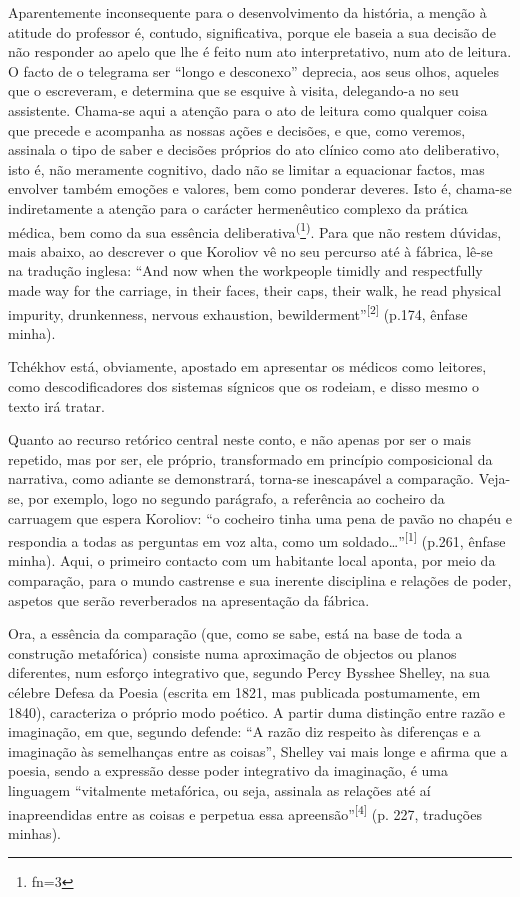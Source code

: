 \documentclass{article}
\makeatletter
\newcommand{\fn}{\afterassignment\fn@aux\count0=}
\newcommand{\fn@aux}{\csname fn\the\count0\endcsname}
\makeatother
\begin{document}
Aparentemente inconsequente para o desenvolvimento da história, a menção à
atitude do professor é, contudo, significativa, porque ele baseia a sua decisão
de não responder ao apelo que lhe é feito num ato interpretativo, num ato de
leitura. O facto de o telegrama ser “longo e desconexo” deprecia, aos seus
olhos, aqueles que o escreveram, e determina que se esquive à visita,
delegando-a no seu assistente. Chama-se aqui a atenção para o ato de leitura
como qualquer coisa que precede e acompanha as nossas ações e decisões, e que,
como veremos, assinala o tipo de saber e decisões próprios do ato clínico como
ato deliberativo, isto é, não meramente cognitivo, dado não se limitar a
equacionar factos, mas envolver também emoções e valores, bem como ponderar
deveres. Isto é, chama-se indiretamente a atenção para o carácter hermenêutico
complexo da prática médica, bem como da sua essência
deliberativa\textsuperscript{(}\footnote{\fn3}\textsuperscript{)}. Para que não restem dúvidas, mais abaixo, ao descrever o que Koroliov vê no
seu percurso até à fábrica, lê-se na tradução inglesa: “And now when the
workpeople timidly and respectfully made way for the carriage, in their faces,
their caps, their walk, he read physical impurity, drunkenness, nervous
exhaustion, bewilderment”\textsuperscript{[}\textsuperscript{2}\textsuperscript{]}
(p.174, ênfase minha).

Tchékhov está, obviamente, apostado em apresentar os médicos como leitores, como
descodificadores dos sistemas sígnicos que os rodeiam, e disso mesmo o texto irá
tratar.

Quanto ao recurso retórico central neste conto, e não apenas por ser o mais
repetido, mas por ser, ele próprio, transformado em princípio composicional da
narrativa, como adiante se demonstrará, torna-se inescapável a comparação.
Veja-se, por exemplo, logo no segundo parágrafo, a referência ao cocheiro da
carruagem que espera Koroliov: “o cocheiro tinha uma pena de pavão no chapéu e
respondia a todas as perguntas em voz alta, como um
soldado…”\textsuperscript{[}\textsuperscript{1}\textsuperscript{]}
(p.261, ênfase minha). Aqui, o primeiro contacto com um habitante local aponta,
por meio da comparação, para o mundo castrense e sua inerente disciplina e
relações de poder, aspetos que serão reverberados na apresentação da fábrica.

Ora, a essência da comparação (que, como se sabe, está na base de toda a
construção metafórica) consiste numa aproximação de objectos ou planos
diferentes, num esforço integrativo que, segundo Percy Bysshee Shelley, na sua
célebre Defesa da Poesia (escrita em 1821, mas publicada postumamente, em 1840),
caracteriza o próprio modo poético. A partir duma distinção entre razão e
imaginação, em que, segundo defende: “A razão diz respeito às diferenças e a
imaginação às semelhanças entre as coisas”, Shelley vai mais longe e afirma que
a poesia, sendo a expressão desse poder integrativo da imaginação, é uma
linguagem “vitalmente metafórica, ou seja, assinala as relações até aí
inapreendidas entre as coisas e perpetua essa
apreensão”\textsuperscript{[}\textsuperscript{4}\textsuperscript{]}
(p. 227, traduções minhas).
\end{document}
